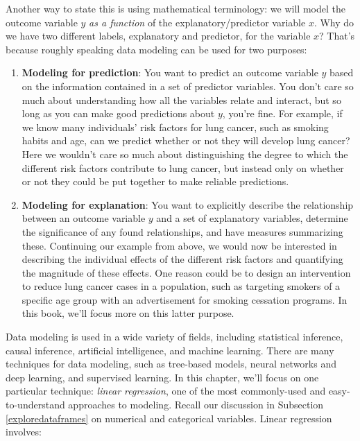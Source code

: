 \documentclass[12pt, krantz2,]{krantz}
\providecommand{\tightlist}{%
  \setlength{\itemsep}{0pt}\setlength{\parskip}{0pt}}
\begin{document}
Another way to state this is using mathematical terminology: we will model the outcome variable \(y\) \emph{as a function} of the explanatory/predictor variable \(x\). Why do we have two different labels, explanatory and predictor, for the variable \(x\)? That's because roughly speaking data modeling can be used for two purposes:

\begin{enumerate}
\def\labelenumi{\arabic{enumi}.}
\tightlist
\item
  \textbf{Modeling for prediction}: You want to predict an outcome variable \(y\) based on the information contained in a set of predictor variables. You don't care so much about understanding how all the variables relate and interact, but so long as you can make good predictions about \(y\), you're fine. For example, if we know many individuals' risk factors for lung cancer, such as smoking habits and age, can we predict whether or not they will develop lung cancer? Here we wouldn't care so much about distinguishing the degree to which the different risk factors contribute to lung cancer, but instead only on whether or not they could be put together to make reliable predictions.
\item
  \textbf{Modeling for explanation}: You want to explicitly describe the relationship between an outcome variable \(y\) and a set of explanatory variables, determine the significance of any found relationships, and have measures summarizing these. Continuing our example from above, we would now be interested in describing the individual effects of the different risk factors and quantifying the magnitude of these effects. One reason could be to design an intervention to reduce lung cancer cases in a population, such as targeting smokers of a specific age group with an advertisement for smoking cessation programs. In this book, we'll focus more on this latter purpose.
\end{enumerate}

Data modeling is used in a wide variety of fields, including statistical inference, causal inference, artificial intelligence, and machine learning. There are many techniques for data modeling, such as tree-based models, neural networks and deep learning, and supervised learning. In this chapter, we'll focus on one particular technique: \emph{linear regression}, one of the most commonly-used and easy-to-understand approaches to modeling. Recall our discussion in Subsection \ref{exploredataframes} on numerical and categorical variables. Linear regression involves:
\end{document}
